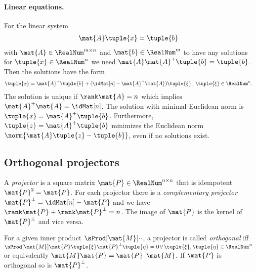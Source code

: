 \paragraph{Linear equations.}
For the linear system
\begin{align}
 \mat{A} \tuple{x} = \tuple{b}
\end{align}
with $\mat{A}\in\RealNum^{m\times n}$ and $\mat{b}\in\RealNum^{m}$ to have any solutions for $\tuple{x}\in\RealNum^{n}$ we need $\mat{A}\mat{A}^+ \tuple{b} = \tuple{b}$.
Then the solutions have the form
\begin{align}
 \tuple{x} = \mat{A}^+\tuple{b} + (\idMat[n]-\mat{A}^+\mat{A})\tuple{\xi}, \ \tuple{\xi}\in\RealNum^{n}.
\end{align}
The solution is unique if $\rank\mat{A}=n$ which implies $\mat{A}^+\mat{A}=\idMat[n]$.
The solution with minimal Euclidean norm is $\tuple{x} = \mat{A}^+\tuple{b}$.
Furthermore, $\tuple{z} = \mat{A}^+\tuple{b}$ minimizes the Euclidean norm $\norm{\mat{A} \tuple{z} - \tuple{b}}$, even if no solutions exist.




\subsection{Orthogonal projectors}\label{sec:OrthogonalProjectors}
A \textit{projector} is a square matrix $\mat{P} \in \RealNum^{n\times n}$ that is idempotent $\mat{P}^2 = \mat{P}$.
For each projector there is a \textit{complementary projector} $\mat{P}^\bot = \idMat[n] - \mat{P}$ and we have $\rank\mat{P} + \rank\mat{P}^\bot = n$.
The image of $\mat{P}$ is the kernel of $\mat{P}^\bot$ and vice versa. 

For a given inner product $\sProd[\mat{M}]{\cdot}{\cdot}$, a projector is called \textit{orthogonal} iff $\sProd[\mat{M}]{\mat{P} \tuple{\xi}}{\mat{P}^\bot\tuple{\eta}} = 0 \,\forall\, \tuple{\xi},\tuple{\eta}\in \RealNum^{n}$ or equivalently $\mat{M} \mat{P} = \mat{P}^\top\!\mat{M}$.
If $\mat{P}$ is orthogonal so is $\mat{P}^\bot$.

